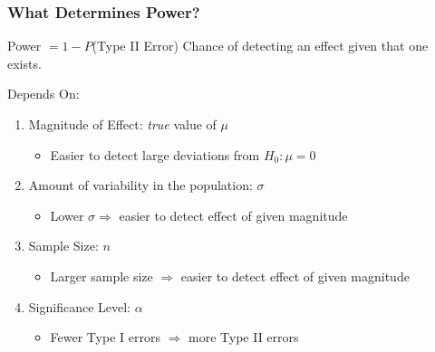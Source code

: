 \begin{frame}
\frametitle{What Determines Power?}
	\begin{block}{Power $ = 1 -  P$(Type II Error)}
Chance of detecting an effect given that one exists.
\end{block}
\begin{block}{Depends On:}
	\begin{enumerate}
\item Magnitude of Effect: \emph{true} value of $\mu$
	\begin{itemize}
		\item Easier to detect large deviations from $H_0\colon \mu = 0$
	\end{itemize}
\item Amount of variability in the population: $\sigma$
	\begin{itemize}
		\item Lower $\sigma \Rightarrow$ easier to detect effect of given magnitude
	\end{itemize}
\item Sample Size: $n$
\begin{itemize}
	\item Larger sample size $\Rightarrow$ easier to detect effect of given magnitude 
\end{itemize}
\item Significance Level: $\alpha$
\begin{itemize}
	\item Fewer Type I errors $\Rightarrow$ more Type II errors
\end{itemize}
\end{enumerate}
\end{block}

\end{frame}

